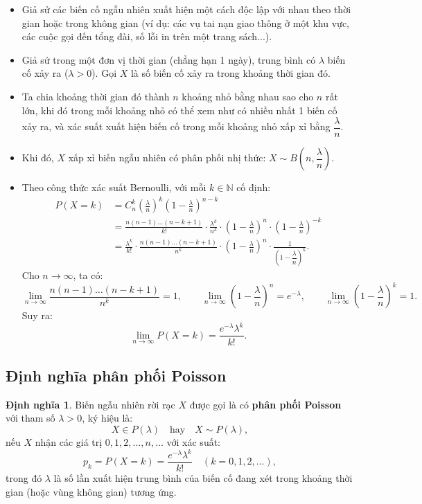\documentclass[12pt,a4paper]{article}
\theoremstyle{definition}
\newtheorem{dinhnghia}{Định nghĩa}[section]
\begin{document}
\begin{itemize}
    \item Giả sử các biến cố ngẫu nhiên xuất hiện một cách độc lập với nhau theo thời gian hoặc trong không gian (ví dụ: các vụ tai nạn giao thông ở một khu vực, các cuộc gọi đến tổng đài, số lỗi in trên một trang sách...).
    \item Giả sử trong một đơn vị thời gian (chẳng hạn 1 ngày), trung bình có $\lambda$ biến cố xảy ra ($\lambda > 0$). Gọi $X$ là số biến cố xảy ra trong khoảng thời gian đó.
    \item Ta chia khoảng thời gian đó thành $n$ khoảng nhỏ bằng nhau sao cho $n$ rất lớn, khi đó trong mỗi khoảng nhỏ có thể xem như có nhiều nhất 1 biến cố xảy ra, và xác suất xuất hiện biến cố trong mỗi khoảng nhỏ xấp xỉ bằng $\dfrac{\lambda}{n}$.
    \item Khi đó, $X$ xấp xỉ biến ngẫu nhiên có phân phối nhị thức: $X \sim B\left(n, \dfrac{\lambda}{n}\right)$.
    \item Theo công thức xác suất Bernoulli, với mỗi $k \in \mathbb{N}$ cố định:
    \begin{align*}
    P(X = k) &= C_n^k \left(\frac{\lambda}{n}\right)^k \left(1 - \frac{\lambda}{n}\right)^{n - k} \\
    &= \frac{n(n - 1)\dots(n - k + 1)}{k!} \cdot \frac{\lambda^k}{n^k} \cdot \left(1 - \frac{\lambda}{n}\right)^n \cdot \left(1 - \frac{\lambda}{n}\right)^{-k} \\
    &= \frac{\lambda^k}{k!} \cdot \frac{n(n - 1)\dots(n - k + 1)}{n^k} \cdot \left(1 - \frac{\lambda}{n}\right)^n \cdot \frac{1}{\left(1 - \dfrac{\lambda}{n}\right)^k}.
    \end{align*}
    Cho $n \to \infty$, ta có:
    \[
    \lim_{n \to \infty} \frac{n(n - 1)\dots(n - k + 1)}{n^k} = 1, \qquad \lim_{n \to \infty} \left(1 - \frac{\lambda}{n}\right)^n = e^{-\lambda}, \qquad \lim_{n \to \infty} \left(1 - \frac{\lambda}{n}\right)^k = 1.
    \]
    Suy ra:
    \[
    \lim_{n \to \infty} P(X = k) = \frac{e^{-\lambda} \lambda^k}{k!}.
    \]
\end{itemize}

\subsection{Định nghĩa phân phối Poisson}

\begin{dinhnghia}
Biến ngẫu nhiên rời rạc $X$ được gọi là có \textbf{phân phối Poisson} với tham số $\lambda > 0$, ký hiệu là:
\[
X \in P(\lambda) \quad \text{hay} \quad X \sim P(\lambda),
\]
nếu $X$ nhận các giá trị $0, 1, 2, \dots, n, \dots$ với xác suất:
\[
p_k = P(X = k) = \frac{e^{-\lambda} \lambda^k}{k!} \quad (k = 0, 1, 2, \dots),
\]
trong đó $\lambda$ là số lần xuất hiện trung bình của biến cố đang xét trong khoảng thời gian (hoặc vùng không gian) tương ứng.
\end{dinhnghia}
\end{document}
